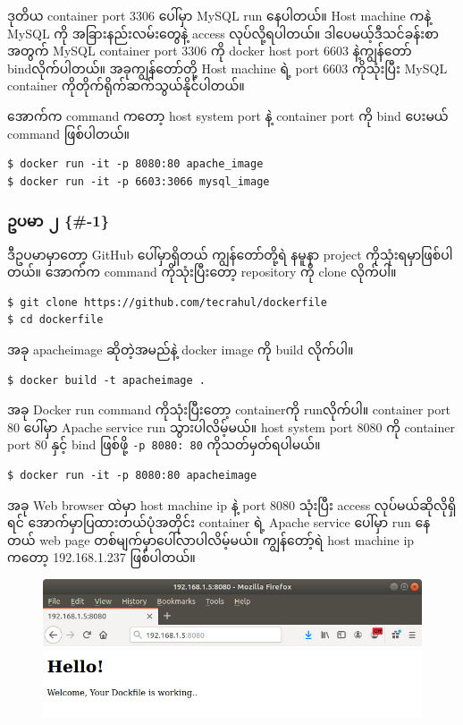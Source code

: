 ဒုတိယ container port 3306 ပေါ်မှာ MySQL run နေပါတယ်။ Host machine ကနဲ့
MySQL ကို အခြားနည်းလမ်းတွေနဲ့ access လုပ်လို့ရပါတယ်။
ဒါပေမယ့်ဒီသင်ခန်းစာအတွက် MySQL container port 3306 ကို docker host port
6603 နဲ့ကျွန်တော် bindလိုက်ပါတယ်။ အခုကျွန်တော်တို့ Host machine ရဲ့ port
6603 ကိုသုံးပြီး MySQL container ကိုတိုက်ရိုက်ဆက်သွယ်နိုင်ပါတယ်။

အောက်က command ကတော့ host system port နဲ့ container port ကို bind ပေးမယ်
command ဖြစ်ပါတယ်။

\begin{verbatim}
$ docker run -it -p 8080:80 apache_image
$ docker run -it -p 6603:3066 mysql_image
\end{verbatim}

\subsubsection{ဥပမာ ၂ \{\#-1\}}\label{ux1025ux1015ux1019--1}

ဒီဥပမာမှာတော့ GitHub ပေါ်မှာရှိတယ် ကျွန်တော်တို့ရဲ နမူနာ project
ကိုသုံးရမှာဖြစ်ပါတယ်။ အောက်က command ကိုသုံးပြီးတော့ repository ကို
clone လိုက်ပါ။

\begin{verbatim}
$ git clone https://github.com/tecrahul/dockerfile
$ cd dockerfile
\end{verbatim}

အခု apacheimage ဆိုတဲ့အမည်နဲ့ docker image ကို build လိုက်ပါ။

\begin{verbatim}
$ docker build -t apacheimage .
\end{verbatim}

အခု Docker run command ကိုသုံးပြီး‌တော့ containerကို runလိုက်ပါ။
container port 80 ပေါ်မှာ Apache service run သွားပါလိမ့်မယ်။ host system
port 8080 ကို container port 80 နှင့် bind ဖြစ်ဖို့ \texttt{-p 8080: 80}
ကိုသတ်မှတ်ရပါမယ်။

\begin{verbatim}
$ docker run -it -p 8080:80 apacheimage
\end{verbatim}

အခု Web browser ထဲမှာ host machine ip နဲ့ port 8080 သုံးပြီး access
လုပ်မယ်ဆိုလိုရှိရင် အောက်မှာပြထားတယ်ပုံအတိုင်း container ရဲ့ Apache
service ပေါ်မှာ run နေတယ် web page တစ်မျက်မှာပေါ်လာပါလိမ့်မယ်။
ကျွန်တော့်ရဲ host machine ip ကတော့ 192.168.1.237 ဖြစ်ပါတယ်။

\begin{figure}[htbp]
\centering
\includegraphics{.gitbook/assets/docker_file_and_docker_port.png}
\end{figure}

